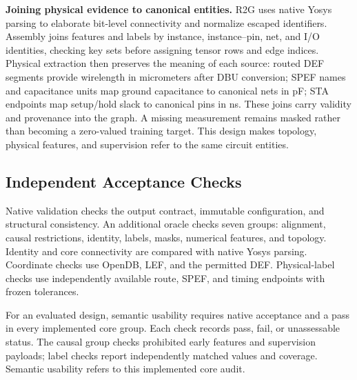 \textbf{Joining physical evidence to canonical entities.} R2G uses native Yosys parsing to elaborate bit-level connectivity and normalize escaped identifiers. Assembly joins features and labels by instance, instance--pin, net, and I/O identities, checking key sets before assigning tensor rows and edge indices. Physical extraction then preserves the meaning of each source: routed DEF segments provide wirelength in micrometers after DBU conversion; SPEF names and capacitance units map ground capacitance to canonical nets in pF; STA endpoints map setup/hold slack to canonical pins in ns. These joins carry validity and provenance into the graph. A missing measurement remains masked rather than becoming a zero-valued training target. This design makes topology, physical features, and supervision refer to the same circuit entities.

\subsection{Independent Acceptance Checks}
Native validation checks the output contract, immutable configuration, and structural consistency. An additional oracle checks seven groups: alignment, causal restrictions, identity, labels, masks, numerical features, and topology. Identity and core connectivity are compared with native Yosys parsing. Coordinate checks use OpenDB, LEF, and the permitted DEF. Physical-label checks use independently available route, SPEF, and timing endpoints with frozen tolerances.

For an evaluated design, semantic usability requires native acceptance and a pass in every implemented core group. Each check records pass, fail, or unassessable status. The causal group checks prohibited early features and supervision payloads; label checks report independently matched values and coverage. Semantic usability refers to this implemented core audit.
